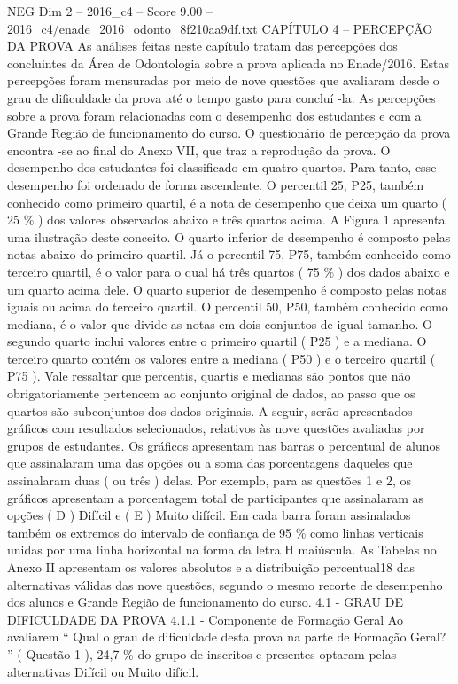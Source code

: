 \begin{textsample}{NEG Dim 2 – 2016\_c4 – Score 9.00 – 2016\_c4/enade\_2016\_odonto\_8f210aa9df.txt}  \label{ex:f2_neg_357}
CAPÍTULO 4 – PERCEPÇÃO DA PROVA As análises feitas neste capítulo tratam das percepções dos concluintes da Área de Odontologia sobre a prova aplicada no Enade/2016.
Estas percepções foram mensuradas por meio de nove questões que avaliaram desde o grau de dificuldade da prova até o tempo gasto para concluí -la.
As percepções sobre a prova foram relacionadas com o desempenho dos estudantes e com a Grande Região de funcionamento do curso.
O questionário de percepção da prova encontra -se ao final do Anexo VII, que traz a reprodução da prova.
O desempenho dos estudantes foi classificado em quatro quartos.
Para tanto, esse desempenho foi ordenado de forma ascendente.
O percentil 25, P25, também conhecido como primeiro quartil, é a nota de desempenho que deixa um quarto ( 25 \% ) dos valores observados abaixo e três quartos acima.
A Figura 1 apresenta uma ilustração deste conceito.
O quarto inferior de desempenho é composto pelas notas abaixo do primeiro quartil.
Já o percentil 75, P75, também conhecido como terceiro quartil, é o valor para o qual há três quartos ( 75 \% ) dos dados abaixo e um quarto acima dele.
O quarto superior de desempenho é composto pelas notas iguais ou acima do terceiro quartil.
O percentil 50, P50, também conhecido como mediana, é o valor que divide as notas em dois conjuntos de igual tamanho.
O segundo quarto inclui valores entre o primeiro quartil ( P25 ) e a mediana.
O terceiro quarto contém os valores entre a mediana ( P50 ) e o terceiro quartil ( P75 ).
Vale ressaltar que percentis, quartis e medianas são pontos que não obrigatoriamente pertencem ao conjunto original de dados, ao passo que os quartos são subconjuntos dos dados originais.
A seguir, serão apresentados gráficos com resultados selecionados, relativos às nove questões avaliadas por grupos de estudantes.
Os gráficos apresentam nas barras o percentual de alunos que assinalaram uma das opções ou a soma das porcentagens daqueles que assinalaram duas ( ou três ) delas.
Por exemplo, para as questões 1 e 2, os gráficos apresentam a porcentagem total de participantes que assinalaram as opções ( D ) Difícil e ( E ) Muito difícil.
Em cada barra foram assinalados também os extremos do intervalo de confiança de 95 \% como linhas verticais unidas por uma linha horizontal na forma da letra H maiúscula.
As Tabelas no Anexo II apresentam os valores absolutos e a distribuição percentual18 das alternativas válidas das nove questões, segundo o mesmo recorte de desempenho dos alunos e Grande Região de funcionamento do curso. 4.1 - GRAU DE DIFICULDADE DA PROVA 4.1.1 - Componente de Formação Geral Ao avaliarem “ Qual o grau de dificuldade desta prova na parte de Formação Geral? ” ( Questão 1 ), 24,7 \% do grupo de inscritos e presentes optaram pelas alternativas Difícil ou Muito difícil.

\end{textsample}
